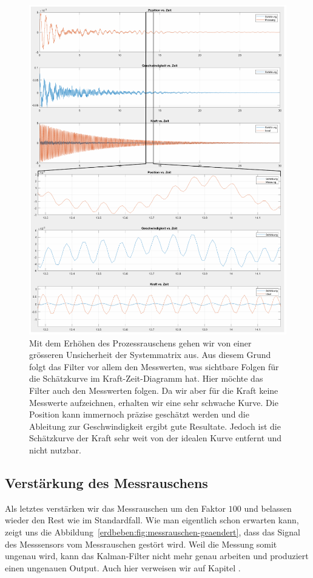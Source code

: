 \begin{figure}
	\begin{center}
		\includegraphics[width=\linewidth,keepaspectratio]{papers/erdbeben/images/Prozessrauschen_geaendert.PDF}
		\caption{Mit dem Erhöhen des Prozessrauschens gehen wir von einer grösseren Unsicherheit der Systemmatrix aus. Aus diesem Grund folgt das Filter vor allem den Messwerten, was sichtbare Folgen für die Schätzkurve im Kraft-Zeit-Diagramm hat. Hier möchte das Filter auch den Messwerten folgen. Da wir aber für die Kraft keine Messwerte aufzeichnen, erhalten wir eine sehr schwache Kurve. Die Position kann immernoch präzise geschätzt werden und die Ableitung zur Geschwindigkeit ergibt gute Resultate. Jedoch ist die Schätzkurve der Kraft sehr weit von der idealen Kurve entfernt und nicht nutzbar.}
    \label{erdbeben:fig:prozessrauschen-geaendert}
	\end{center}
\end{figure}

\subsection{Verstärkung des Messrauschens}
Als letztes verstärken wir das Messrauschen um den Faktor $100$ und belassen wieder den Rest wie im Standardfall.
Wie man eigentlich schon erwarten kann, zeigt uns die Abbildung~\ref{erdbeben:fig:messrauschen-geaendert}, dass das Signal des Messsensors vom Messrauschen gestört wird.
Weil die Messung somit ungenau wird, kann das Kalman-Filter nicht mehr genau arbeiten und produziert einen ungenauen Output.
Auch hier verweisen wir auf Kapitel .

